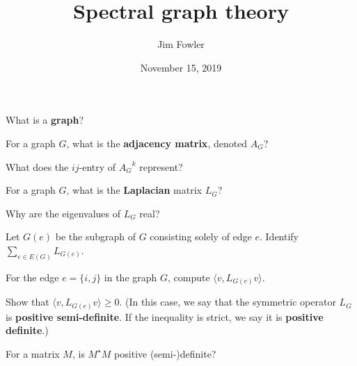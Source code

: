 \documentclass{homework}
\author{Jim Fowler}
\title{Spectral graph theory}
\date{November 15, 2019}
\begin{document}
\maketitle

\begin{problem}
  What is a \textbf{graph}?
\end{problem}

\vfill

\begin{problem}
  For a graph $G$, what is the \textbf{adjacency matrix}, denoted $A_G$?
\end{problem}

\vfill

\begin{problem}
  What does the $ij$-entry of ${A_G}^k$ represent?
\end{problem}

\vfill

\begin{problem}
  For a graph $G$, what is the \textbf{Laplacian} matrix $L_G$?
\end{problem}

\vfill

\begin{problem}
  Why are the eigenvalues of $L_G$ real?
\end{problem}

\vfill

\begin{problem}
  Let $G(e)$ be the subgraph of $G$ consisting solely of edge $e$.  Identify $\sum_{e \in E(G)} L_{G(e)}$.
\end{problem}

\vfill

\begin{problem}
  For the edge $e = \{i,j\}$ in the graph $G$, compute
  $\langle v, L_{G(e)} v \rangle$.
\end{problem}

\vfill

\begin{problem}
  Show that $\langle v, L_{G(e)} v \rangle \geq 0$.  (In this case, we say that the symmetric operator $L_G$ is \textbf{positive semi-definite}.  If the inequality is strict, we say it is \textbf{positive definite}.)
\end{problem}

\vfill

\begin{problem}
  For a matrix $M$, is $M^\star M$ positive (semi-)definite?  
\end{problem}
\end{document}

